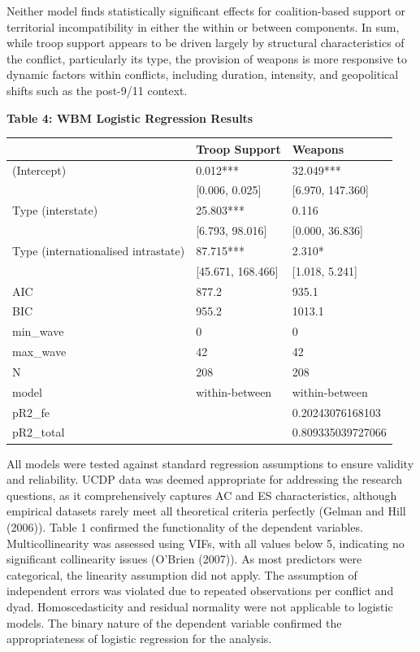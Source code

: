 \documentclass[
]{article}
\begin{document}
Neither model finds statistically significant effects for
coalition-based support or territorial incompatibility in either the
within or between components. In sum, while troop support appears to be
driven largely by structural characteristics of the conflict,
particularly its type, the provision of weapons is more responsive to
dynamic factors within conflicts, including duration, intensity, and
geopolitical shifts such as the post-9/11 context.

\noindent\textbf{Table 4: WBM Logistic Regression Results}

\begin{tabular}{lll}
\hline
& Troop Support & Weapons \\ \hline
(Intercept) & \num{0.012}*** & \num{32.049}*** \\
& [\num{0.006}, \num{0.025}] & [\num{6.970}, \num{147.360}] \\
Type (interstate) & \num{25.803}*** & \num{0.116} \\
& [\num{6.793}, \num{98.016}] & [\num{0.000}, \num{36.836}] \\
Type (internationalised intrastate) & \num{87.715}*** & \num{2.310}* \\
& [\num{45.671}, \num{168.466}] & [\num{1.018}, \num{5.241}] \\
AIC & \num{877.2} & \num{935.1} \\
BIC & \num{955.2} & \num{1013.1} \\
min\_wave & 0 & 0 \\
max\_wave & 42 & 42 \\
N & 208 & 208 \\
model & within-between & within-between \\
pR2\_fe &  & 0.20243076168103 \\
pR2\_total &  & 0.809335039727066 \\
\hline
\end{tabular}

All models were tested against standard regression assumptions to ensure
validity and reliability. UCDP data was deemed appropriate for
addressing the research questions, as it comprehensively captures AC and
ES characteristics, although empirical datasets rarely meet all
theoretical criteria perfectly (Gelman and Hill (2006)). Table 1
confirmed the functionality of the dependent variables.
Multicollinearity was assessed using VIFs, with all values below 5,
indicating no significant collinearity issues (O'Brien (2007)). As most
predictors were categorical, the linearity assumption did not apply. The
assumption of independent errors was violated due to repeated
observations per conflict and dyad. Homoscedasticity and residual
normality were not applicable to logistic models. The binary nature of
the dependent variable confirmed the appropriateness of logistic
regression for the analysis.
\end{document}
